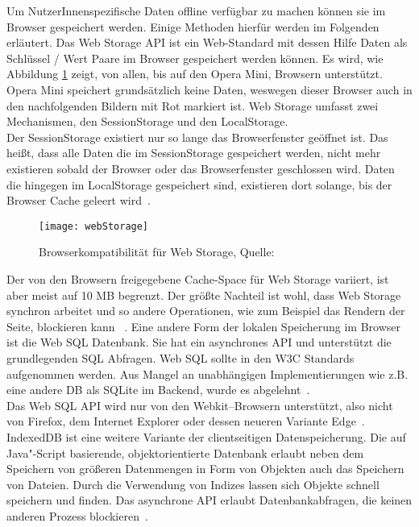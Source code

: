 Um NutzerInnenspezifische Daten offline verfügbar zu machen können sie im Browser gespeichert werden. Einige Methoden hierfür werden im Folgenden erläutert.
%
Das Web Storage \gls{API} ist ein Web-Standard mit dessen Hilfe Daten als Schlüssel / Wert Paare im Browser gespeichert werden können. Es wird, wie Abbildung \ref{fig:webStorage} zeigt, von allen, bis auf den Opera Mini,  Browsern unterstützt. Opera Mini speichert grundsätzlich keine Daten, weswegen dieser Browser auch in den nachfolgenden Bildern mit Rot markiert ist.
Web Storage umfasst zwei Mechanismen, den SessionStorage und den LocalStorage.\\
Der SessionStorage existiert nur so lange das Browserfenster geöffnet ist.
Das heißt, dass alle Daten die im SessionStorage gespeichert werden, nicht mehr existieren sobald der Browser oder das Browserfenster geschlossen wird.
Daten die hingegen im LocalStorage gespeichert sind, existieren dort solange, bis der Browser Cache geleert wird~\cite{webstorage}.
\begin{figure}[H]
	\centering
	\texttt{[image: webStorage]}
	\grayRule
	\caption[Browserkompatibilität für Web Storage]{Browserkompatibilität für Web Storage, Quelle: ~\cite{caniuse-ws}}
	\label{fig:webStorage}
\end{figure}
Der von den Browsern freigegebene Cache-Space für Web Storage variiert, ist aber meist auf 10 MB begrenzt.
Der größte Nachteil ist wohl, dass Web Storage synchron arbeitet und so andere Operationen, wie zum Beispiel das Rendern der Seite, blockieren kann ~\cite{webstorage-con}.
%
%
Eine andere Form der lokalen Speicherung im Browser ist die Web SQL Datenbank.
Sie hat ein asynchrones \gls{API} und unterstützt die grundlegenden SQL Abfragen. Web SQL sollte in den W3C Standards aufgenommen werden. Aus Mangel an unabhängigen Implementierungen wie z.B. eine andere \gls{DB} als SQLite im Backend, wurde es abgelehnt~\cite{websql}.\\
Das Web SQL \gls{API} wird nur von den Webkit--Browsern unterstützt, also nicht von Firefox, dem Internet Explorer oder dessen neueren Variante Edge~\cite{caniuse-websql}.
%
%
IndexedDB ist eine weitere Variante der clientseitigen Datenspeicherung. Die auf Java"-Script basierende, objektorientierte Datenbank erlaubt neben dem Speichern von größeren Datenmengen in Form von Objekten auch das Speichern von Dateien. Durch die Verwendung von Indizes lassen sich Objekte schnell speichern und finden. Das asynchrone \gls{API} erlaubt Datenbankabfragen, die keinen anderen Prozess blockieren~\cite{idb}.
